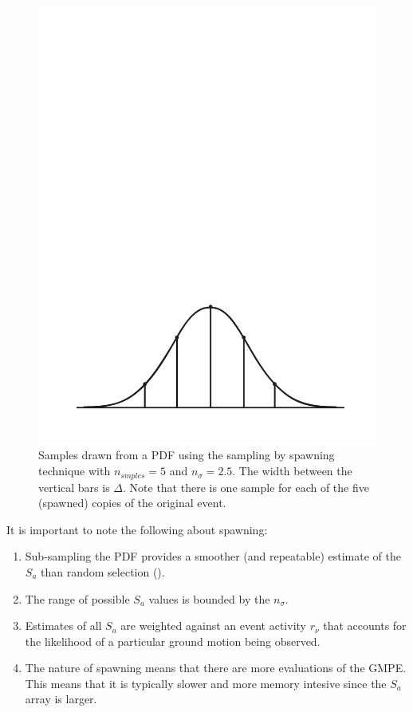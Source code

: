 \begin{figure}
\includegraphics[width=1\textwidth]{diags/fig-hattn-spawning}
\caption{Samples drawn from a PDF using the sampling by spawning
technique with $n_{smples}=5$ and $n_\sigma=2.5$. The width between
the vertical bars is $\Delta$. Note that there is one sample for
each of the five (spawned) copies of the original event.}
\label{fig:hattn-spawnsamp}
\end{figure}

It is important to note the following about spawning:
\begin{enumerate}
\item Sub-sampling the PDF provides a smoother (and repeatable)
estimate of the $S_a$ than random selection
(). \item The range of possible $S_a$
values is bounded by the $n_\sigma$. \item Estimates of all $S_a$
are weighted against an event activity $r_\nu$ that accounts for the
likelihood of a particular ground motion being observed. \item The
nature of spawning means that there are more evaluations of the
GMPE. This means that it is typically slower and more memory
intesive since the $S_a$ array is larger.
\end{enumerate}




